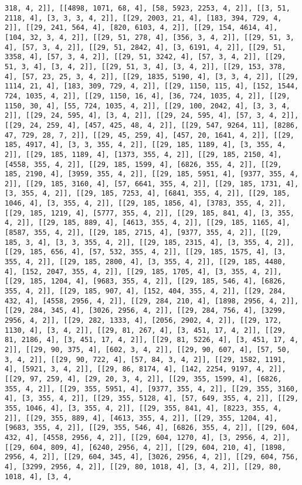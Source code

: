 \documentclass[12pt,fleqn]{article}\usepackage{../../common}
\begin{document}
\begin{verbatim}
318, 4, 2]], [[4898, 1071, 68, 4], [58, 5923, 2253, 4, 2]], [[3, 51, 2118, 4], [3, 3, 3, 4, 2]], [[29, 2003, 21, 4], [183, 394, 729, 4, 2]], [[29, 241, 564, 4], [820, 6103, 4, 2]], [[29, 154, 4614, 4], [104, 32, 3, 4, 2]], [[29, 51, 278, 4], [356, 3, 4, 2]], [[29, 51, 3, 4], [57, 3, 4, 2]], [[29, 51, 2842, 4], [3, 6191, 4, 2]], [[29, 51, 3358, 4], [57, 3, 4, 2]], [[29, 51, 3242, 4], [57, 3, 4, 2]], [[29, 51, 3, 4], [3, 4, 2]], [[29, 51, 3, 4], [3, 4, 2]], [[29, 153, 378, 4], [57, 23, 25, 3, 4, 2]], [[29, 1835, 5190, 4], [3, 3, 4, 2]], [[29, 1114, 21, 4], [183, 309, 729, 4, 2]], [[29, 1150, 115, 4], [152, 1544, 724, 1035, 4, 2]], [[29, 1150, 16, 4], [36, 724, 1035, 4, 2]], [[29, 1150, 30, 4], [55, 724, 1035, 4, 2]], [[29, 100, 2042, 4], [3, 3, 4, 2]], [[29, 24, 595, 4], [3, 4, 2]], [[29, 24, 595, 4], [57, 3, 4, 2]], [[29, 24, 259, 4], [457, 425, 48, 4, 2]], [[29, 547, 9264, 11], [8286, 47, 729, 28, 7, 2]], [[29, 45, 259, 4], [457, 20, 1641, 4, 2]], [[29, 185, 4917, 4], [3, 3, 355, 4, 2]], [[29, 185, 1189, 4], [3, 355, 4, 2]], [[29, 185, 1189, 4], [1373, 355, 4, 2]], [[29, 185, 2150, 4], [4558, 355, 4, 2]], [[29, 185, 1599, 4], [6826, 355, 4, 2]], [[29, 185, 2190, 4], [3959, 355, 4, 2]], [[29, 185, 5951, 4], [9377, 355, 4, 2]], [[29, 185, 3160, 4], [57, 6641, 355, 4, 2]], [[29, 185, 1731, 4], [3, 355, 4, 2]], [[29, 185, 7253, 4], [6841, 355, 4, 2]], [[29, 185, 1046, 4], [3, 355, 4, 2]], [[29, 185, 1856, 4], [3783, 355, 4, 2]], [[29, 185, 1219, 4], [5777, 355, 4, 2]], [[29, 185, 841, 4], [3, 355, 4, 2]], [[29, 185, 889, 4], [4613, 355, 4, 2]], [[29, 185, 1165, 4], [8587, 355, 4, 2]], [[29, 185, 2715, 4], [9377, 355, 4, 2]], [[29, 185, 3, 4], [3, 3, 355, 4, 2]], [[29, 185, 2315, 4], [3, 355, 4, 2]], [[29, 185, 656, 4], [57, 532, 355, 4, 2]], [[29, 185, 1575, 4], [3, 355, 4, 2]], [[29, 185, 2800, 4], [3, 355, 4, 2]], [[29, 185, 4480, 4], [152, 2047, 355, 4, 2]], [[29, 185, 1705, 4], [3, 355, 4, 2]], [[29, 185, 1204, 4], [9683, 355, 4, 2]], [[29, 185, 546, 4], [6826, 355, 4, 2]], [[29, 185, 907, 4], [152, 404, 355, 4, 2]], [[29, 284, 432, 4], [4558, 2956, 4, 2]], [[29, 284, 210, 4], [1898, 2956, 4, 2]], [[29, 284, 345, 4], [3026, 2956, 4, 2]], [[29, 284, 756, 4], [3299, 2956, 4, 2]], [[29, 282, 1333, 4], [2056, 2902, 4, 2]], [[29, 172, 1130, 4], [3, 4, 2]], [[29, 81, 267, 4], [3, 451, 17, 4, 2]], [[29, 81, 2186, 4], [3, 451, 17, 4, 2]], [[29, 81, 5226, 4], [3, 451, 17, 4, 2]], [[29, 90, 375, 4], [602, 3, 4, 2]], [[29, 90, 607, 4], [57, 50, 3, 4, 2]], [[29, 90, 722, 4], [57, 84, 3, 4, 2]], [[29, 1582, 1191, 4], [5921, 3, 4, 2]], [[29, 86, 8174, 4], [142, 2254, 9197, 4, 2]], [[29, 97, 259, 4], [29, 20, 3, 4, 2]], [[29, 355, 1599, 4], [6826, 355, 4, 2]], [[29, 355, 5951, 4], [9377, 355, 4, 2]], [[29, 355, 3160, 4], [3, 355, 4, 2]], [[29, 355, 5128, 4], [57, 649, 355, 4, 2]], [[29, 355, 1046, 4], [3, 355, 4, 2]], [[29, 355, 841, 4], [8223, 355, 4, 2]], [[29, 355, 889, 4], [4613, 355, 4, 2]], [[29, 355, 1204, 4], [9683, 355, 4, 2]], [[29, 355, 546, 4], [6826, 355, 4, 2]], [[29, 604, 432, 4], [4558, 2956, 4, 2]], [[29, 604, 1270, 4], [3, 2956, 4, 2]], [[29, 604, 809, 4], [6240, 2956, 4, 2]], [[29, 604, 210, 4], [1898, 2956, 4, 2]], [[29, 604, 345, 4], [3026, 2956, 4, 2]], [[29, 604, 756, 4], [3299, 2956, 4, 2]], [[29, 80, 1018, 4], [3, 4, 2]], [[29, 80, 1018, 4], [3, 4, 
\end{verbatim}
\end{document}
